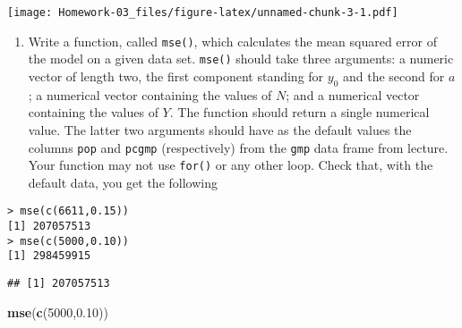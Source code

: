 \documentclass[
]{article}
\newenvironment{Shaded}{\begin{snugshade}}{\end{snugshade}}
\newcommand{\ControlFlowTok}[1]{\textcolor[rgb]{0.13,0.29,0.53}{\textbf{#1}}}
\newcommand{\DecValTok}[1]{\textcolor[rgb]{0.00,0.00,0.81}{#1}}
\newcommand{\FloatTok}[1]{\textcolor[rgb]{0.00,0.00,0.81}{#1}}
\newcommand{\KeywordTok}[1]{\textcolor[rgb]{0.13,0.29,0.53}{\textbf{#1}}}
\newcommand{\NormalTok}[1]{#1}
\newcommand{\OperatorTok}[1]{\textcolor[rgb]{0.81,0.36,0.00}{\textbf{#1}}}
\providecommand{\tightlist}{%
  \setlength{\itemsep}{0pt}\setlength{\parskip}{0pt}}
\begin{document}
\texttt{[image: Homework-03\_files/figure-latex/unnamed-chunk-3-1.pdf]}

\begin{enumerate}
\def\labelenumi{\arabic{enumi}.}
\setcounter{enumi}{1}
\tightlist
\item
  Write a function, called \texttt{mse()}, which calculates the mean
  squared error of the model on a given data set. \texttt{mse()} should
  take three arguments: a numeric vector of length two, the first
  component standing for \(y_0\) and the second for \(a\); a numerical
  vector containing the values of \(N\); and a numerical vector
  containing the values of \(Y\). The function should return a single
  numerical value. The latter two arguments should have as the default
  values the columns \texttt{pop} and \texttt{pcgmp} (respectively) from
  the \texttt{gmp} data frame from lecture. Your function may not use
  \texttt{for()} or any other loop. Check that, with the default data,
  you get the following
\end{enumerate}

\begin{verbatim}
> mse(c(6611,0.15))
[1] 207057513
> mse(c(5000,0.10))
[1] 298459915
\end{verbatim}

\begin{Shaded}
\end{Shaded}

\begin{verbatim}
## [1] 207057513
\end{verbatim}

\begin{Shaded}
\begin{Highlighting}[]
\KeywordTok{mse}\NormalTok{(}\KeywordTok{c}\NormalTok{(}\DecValTok{5000}\NormalTok{,}\FloatTok{0.10}\NormalTok{))}
\end{Highlighting}
\end{Shaded}
\end{document}

